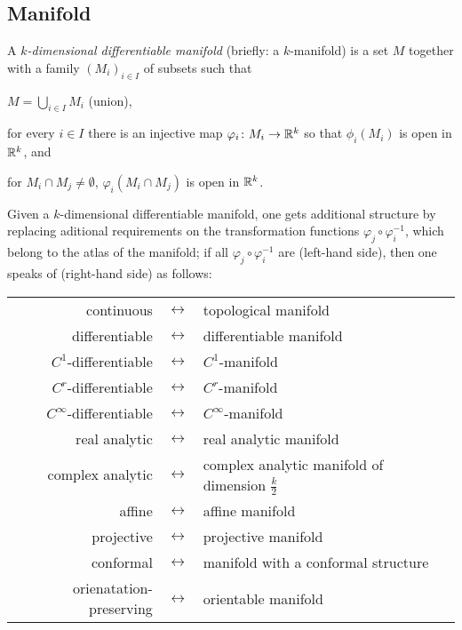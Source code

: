 \documentclass[../main.tex]{subfiles}
\begin{document}
\subsection{Manifold}
\begin{definition}\label{Manifold}
A \textit{$k$-dimensional differentiable manifold} (briefly: a $k$-manifold)
is a set $M$ together with a family $\left(M_i\right)_{i\in I}$ of subsets such that
\begin{APAenumerate}
\item $M=\bigcup_{i\in I} M_i$ (union),
\item for every $i\in I$ there is an injective map $\varphi_i\colon M_i\to\mathbb{R}^k$ so that $\phi_i\left(M_i\right)$ is open in $\mathbb{R}^k$, and
\item for $M_i\cap M_j\ne\emptyset$, $\varphi_i\left(M_i\cap M_j\right)$ is open in $\mathbb{R}^k$.
\end{APAenumerate}
\end{definition}
\begin{definition}\label{Manifold:Extended}
Given a $k$-dimensional differentiable manifold,
one gets additional structure
by replacing aditional requirements on the transformation functions $\varphi_j\circ\varphi_i^{-1}$,
which belong to the atlas of the manifold;
if all $\varphi_j\circ\varphi_i^{-1}$ are (left-hand side),
then one speaks of (right-hand side) as follows:
\begin{center}
\begin{tabular}{ r c l }
continuous&$\leftrightarrow$&topological manifold                                 \\
differentiable&$\leftrightarrow$&differentiable manifold                              \\
$C^1$-differentiable&$\leftrightarrow$&$C^1$-manifold                                       \\
$C^r$-differentiable&$\leftrightarrow$&$C^r$-manifold                                       \\
$C^\infty$-differentiable&$\leftrightarrow$&$C^\infty$-manifold                                  \\
real analytic&$\leftrightarrow$&real analytic manifold                               \\
complex analytic&$\leftrightarrow$&complex analytic manifold of dimension $\frac{k}{2}$ \\
affine&$\leftrightarrow$&affine manifold                                      \\
projective&$\leftrightarrow$&projective manifold                                  \\
conformal&$\leftrightarrow$&manifold with a conformal structure                  \\
orienatation-preserving&$\leftrightarrow$&orientable manifold                                  \\
\end{tabular}
\end{center}
\end{definition}
\end{document}
